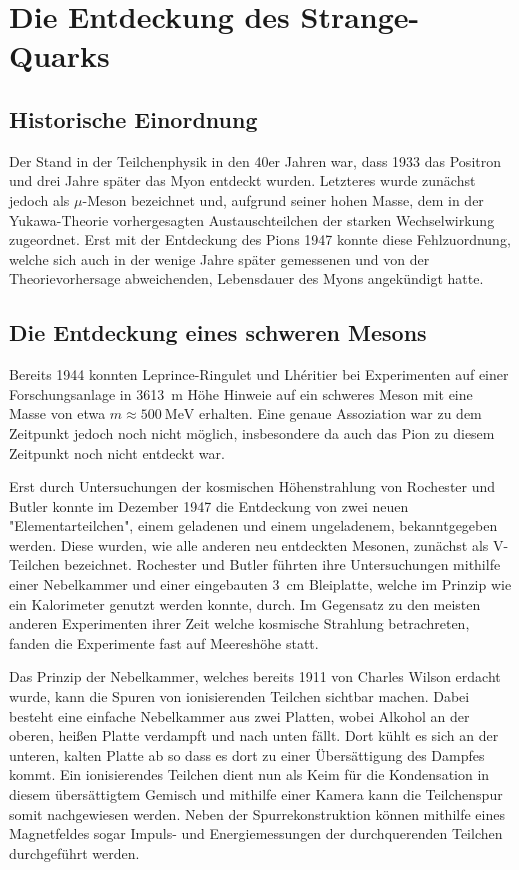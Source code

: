 
\section{Die Entdeckung des Strange-Quarks}


\subsection{Historische Einordnung}

Der Stand in der Teilchenphysik in den 40er Jahren war, dass 1933 das Positron und drei Jahre später das Myon entdeckt wurden.
Letzteres wurde zunächst jedoch als $\mu$-Meson bezeichnet und, aufgrund seiner hohen Masse, dem in der Yukawa-Theorie vorhergesagten Austauschteilchen der starken Wechselwirkung zugeordnet.
Erst mit der Entdeckung des Pions 1947 konnte diese Fehlzuordnung, welche sich auch in der wenige Jahre später gemessenen und von der Theorievorhersage abweichenden, Lebensdauer des Myons angekündigt hatte.

\subsection{Die Entdeckung eines schweren Mesons}

Bereits 1944 konnten Leprince-Ringulet und Lhéritier bei Experimenten auf einer Forschungsanlage in \SI{3613}{\metre} Höhe Hinweie auf ein schweres Meson mit eine Masse von etwa $m \approx \SI{500}{\mega\electronvolt}$ erhalten.
Eine genaue Assoziation war zu dem Zeitpunkt jedoch noch nicht möglich, insbesondere da auch das Pion zu diesem Zeitpunkt noch nicht entdeckt war.

Erst durch Untersuchungen der kosmischen Höhenstrahlung von Rochester und Butler konnte im Dezember 1947 die Entdeckung von zwei neuen "Elementarteilchen", einem geladenen und einem ungeladenem, bekanntgegeben werden.
Diese wurden, wie alle anderen neu entdeckten Mesonen, zunächst als V-Teilchen bezeichnet.
Rochester und Butler führten ihre Untersuchungen mithilfe einer Nebelkammer und einer eingebauten \SI{3}{\centi\metre} Bleiplatte, welche im Prinzip wie ein Kalorimeter genutzt werden konnte, durch. 
Im Gegensatz zu den meisten anderen Experimenten ihrer Zeit welche kosmische Strahlung betrachreten, fanden die Experimente fast auf Meereshöhe statt.

Das Prinzip der Nebelkammer, welches bereits 1911 von Charles Wilson erdacht wurde, kann die Spuren von ionisierenden Teilchen sichtbar machen.
Dabei besteht eine einfache Nebelkammer aus zwei Platten, wobei Alkohol an der oberen, heißen Platte verdampft und nach unten fällt.
Dort kühlt es sich an der unteren, kalten Platte ab so dass es dort zu einer Übersättigung des Dampfes kommt.
Ein ionisierendes Teilchen dient nun als Keim für die Kondensation in diesem übersättigtem Gemisch und mithilfe einer Kamera kann die Teilchenspur somit nachgewiesen werden.
Neben der Spurrekonstruktion können mithilfe eines Magnetfeldes sogar Impuls- und Energiemessungen der durchquerenden Teilchen durchgeführt werden.

